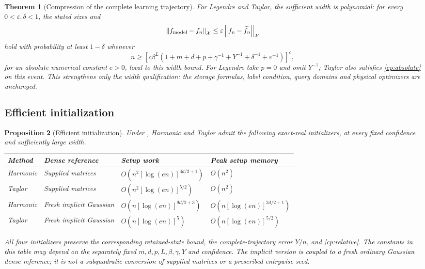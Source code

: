 \documentclass[11pt]{article}
\newtheorem{theorem}{Theorem}[section]
\newtheorem{proposition}[theorem]{Proposition}
\theoremstyle{definition}
\theoremstyle{remark}
\newcommand{\norm}[1]{\left\lVert#1\right\rVert}
\begin{document}
\begin{theorem}[Compression of the complete learning trajectory]
For Legendre and Taylor, the sufficient width is polynomial: for every
$0<\varepsilon,\delta<1$, the stated sizes and
\[
 \norm{f_{\rm model}-f_n}_{\mathcal X}
 \le\varepsilon\norm{f_n-\widetilde f_n}_{\mathcal X}
\]
hold with probability at least $1-\delta$ whenever
\begin{equation}
 n\ge\left[c\beta^L
 (1+m+d+p+\gamma^{-1}+Y^{-1}+\delta^{-1}+\varepsilon^{-1})\right]^c,
 \label{cp:polynomial-onset}
\end{equation}
for an absolute numerical constant $c>0$, local to this width bound.
For Legendre take $p=0$ and omit
$Y^{-1}$; Taylor also satisfies \eqref{cp:absolute} on this event.
This strengthens only the width qualification: the storage formulas, label
condition, query domains and physical optimizers are unchanged.
\end{theorem}



\subsection{Efficient initialization}

\begin{proposition}[Efficient initialization]
\label{cp:initialization}
Under , Harmonic and Taylor admit the following exact-real
initializers, at every fixed confidence and sufficiently large width.
\begin{center}\small
\begin{tabular}{@{}llll@{}}
\toprule
Method & Dense reference & Setup work & Peak setup memory\\
\midrule
Harmonic & Supplied matrices
 & $O(n^2[\log(en)]^{3d/2+1})$ & $O(n^2)$\\
Taylor & Supplied matrices
 & $O(n^2[\log(en)]^{5/2})$ & $O(n^2)$\\
Harmonic & Fresh implicit Gaussian
 & $O(n[\log(en)]^{9d/2+3})$ & $O(n[\log(en)]^{3d/2+1})$\\
Taylor & Fresh implicit Gaussian
 & $O(n[\log(en)]^5)$ & $O(n[\log(en)]^{5/2})$\\
\bottomrule
\end{tabular}
\end{center}
All four initializers preserve the corresponding retained-state bound,
the complete-trajectory error $Y/n$, and \eqref{cp:relative}.
The constants in this table may depend on the separately fixed
$m,d,p,L,\beta,\gamma,Y$ and confidence. The implicit version is coupled to a
fresh ordinary Gaussian dense reference; it is not a subquadratic conversion
of supplied matrices or a prescribed entrywise seed.
\end{proposition}
\end{document}
